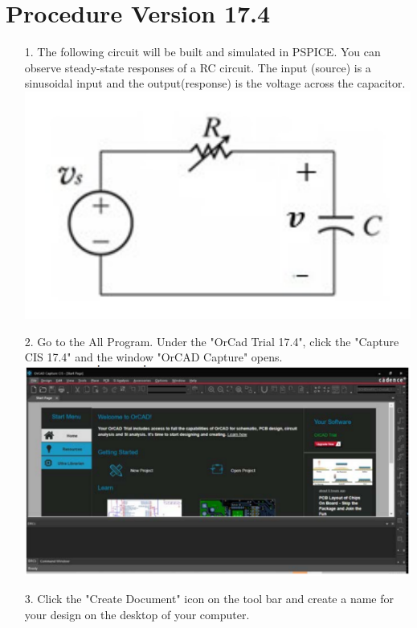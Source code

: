 \documentclass[a4paper]{article}
\begin{document}
\section*{Procedure Version 17.4}
\begin{itemize}
  \item[1.] The following circuit will be built and simulated in PSPICE. You can observe steady-state responses of a RC circuit. The input (source) is a sinusoidal input and the output(response) is the voltage across the capacitor. \\
  \includegraphics[scale=0.5]{diagram.png} \\   
  \item[2.] Go to the All Program. Under the "OrCad Trial 17.4", click the "Capture CIS 17.4" and the window "OrCAD Capture" opens. \\
  \includegraphics[scale=0.5]{1.png} \\ 
  \item[3.] Click the "Create Document" icon on the tool bar and create a name for your design on the desktop of your computer.
  \begin{itemize}

\end{itemize}
\end{itemize}
\end{document}
